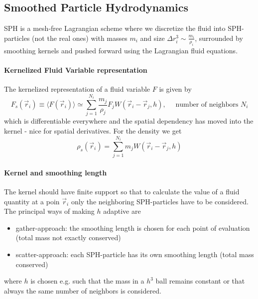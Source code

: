 \subsection*{Smoothed Particle Hydrodynamics}
SPH is a mesh-free Lagrangian scheme where we discretize the fluid into SPH-particles
(not the real ones) with masses $m_i$ and size $\Delta r_i^3 \sim \frac{m_i}{\rho_i}$, 
surrounded by smoothing kernels and pushed forward
using the Lagrangian fluid equations.

\paragraph*{Kernelized Fluid Variable representation} The kernelized representation
of a fluid variable $F$ is given by
\begin{equation}
    F_s(\vec{r}_i) \equiv\langle F(\vec{r}_i)\rangle \simeq \sum_{j=1}^{N_i} \frac{m_j}{\rho_j} F_j W\left(\vec{r}_i-\vec{r}_j, h\right), \quad \text { number of neighbors } N_i
\end{equation}
which is differentiable everywhere and the spatial dependency has moved
into the kernel - nice for spatial derivatives. For the density
we get
\begin{equation}
    \rho_s (\vec{r}_i) = \sum_{j=1}^{N_i} m_j W(\vec{r}_i - \vec{r}_j,h)
\end{equation}
\paragraph*{Kernel and smoothing length} The kernel should have finite support
so that to calculate the value of a fluid quantity at a poin $\vec{r}_i$ only
the neighboring SPH-particles have to be considered.
The principal ways of making $h$ adaptive are
\begin{itemize}
    \item gather-approach: the smoothing length is chosen for each point of evaluation (total mass not exactly conserved)
    \item scatter-approach: each SPH-particle has its own smoothing length (total mass conserved)
\end{itemize}
where $h$ is chosen e.g. such that the mass in a $h^3$ ball remains constant or that
always the same number of neighbors is considered.

